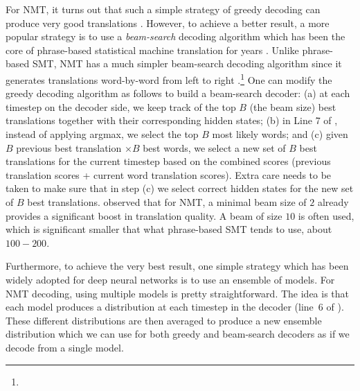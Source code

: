 For NMT, it turns out that such a simple strategy of greedy decoding can produce
very good translations \cite{sutskever14}. However, to achieve a better result,
a more popular strategy is to use a {\it beam-search} decoding algorithm which has been the
core of phrase-based statistical machine translation for years \cite{Koehn:2003:SMT}.
Unlike phrase-based SMT, NMT has a much simpler beam-search decoding algorithm
since it generates translations word-by-word from left to right .\footnote{} One can modify
the greedy decoding algorithm as follows to build a beam-search decoder: (a) at
each timestep on the decoder side, we keep track of the top $B$ (the beam size) best
translations together with their corresponding hidden states; (b) in Line 7 of
, instead of applying argmax, we select the top $B$ most
likely words; and (c) given $B$ previous best translation $\times B$ best words, we
select a new set of $B$ best translations for the current timestep based on the
combined scores (previous translation scores + current word translation scores).
Extra care needs to be taken to make sure that in step (c) we select correct
hidden states for the new set of $B$ best translations. 
observed that for NMT, a minimal beam size of $2$ already provides a significant
boost in translation quality. A beam of size $10$ is often used, which is
significant smaller that what phrase-based SMT tends to use, about $100-200$.

Furthermore, to achieve the very best result, one simple strategy which has been
widely adopted for deep neural networks is to use an ensemble of models. For NMT
decoding, using multiple models is pretty straightforward. The idea is that each
model produces a distribution at each timestep in the decoder (line~6 of
). These different distributions are then averaged to produce
a new ensemble distribution which we can use for both greedy and beam-search
decoders as if we decode from a single model.

